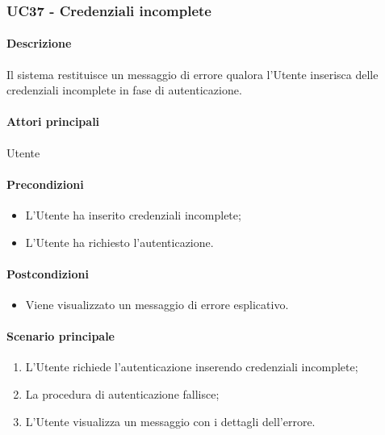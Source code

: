 \subsubsection{UC37 - Credenziali incomplete}\label{UC37}
\paragraph*{Descrizione}
Il sistema restituisce un messaggio di errore qualora l'Utente inserisca delle credenziali incomplete in fase di autenticazione.

\paragraph*{Attori principali}
Utente

\paragraph*{Precondizioni}
\begin{itemize}
  \item L'Utente ha inserito credenziali incomplete;
  \item L'Utente ha richiesto l'autenticazione. 
\end{itemize}

\paragraph*{Postcondizioni}
\begin{itemize}
  \item Viene visualizzato un messaggio di errore esplicativo.
\end{itemize}

\paragraph*{Scenario principale}
\begin{enumerate}
  \item L'Utente richiede l'autenticazione inserendo credenziali incomplete;
  \item La procedura di autenticazione fallisce;
  \item L'Utente visualizza un messaggio con i dettagli dell'errore.
\end{enumerate}